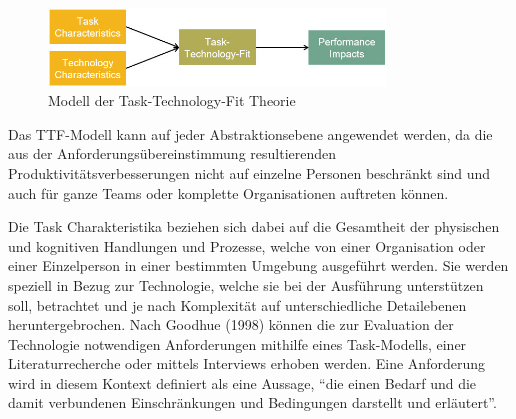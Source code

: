 \begin{figure}[h]
    \centering
    \includegraphics[width=0.8\textwidth]{img/TTF_einfach.jpg}
    \caption[Modell der Task-Technology-Fit Theorie]{Modell der Task-Technology-Fit Theorie\autocite{TTF}}
    \label{fig:TTF}
\end{figure}


Das TTF-Modell kann auf jeder Abstraktionsebene angewendet werden, da die aus der Anforderungsübereinstimmung resultierenden Produktivitätsverbesserungen nicht auf einzelne Personen beschränkt sind und auch für ganze Teams oder komplette Organisationen auftreten können.\autocite[Vgl.][S. 1827f]{GOODHUE1995b} 



Die Task Charakteristika beziehen sich dabei auf die Gesamtheit der physischen und kognitiven Handlungen und Prozesse, welche von einer Organisation oder einer Einzelperson in einer bestimmten Umgebung ausgeführt werden. Sie werden speziell in Bezug zur Technologie, welche sie bei der Ausführung unterstützen soll, betrachtet und je nach Komplexität auf unterschiedliche Detailebenen heruntergebrochen. \autocite[Vgl.][S. 398]{SPIES2020} Nach Goodhue (1998) können die zur Evaluation der Technologie notwendigen Anforderungen mithilfe eines Task-Modells, einer Literaturrecherche oder mittels Interviews erhoben werden.\autocite[Vgl.][S. 126]{GOODHUE1998} Eine Anforderung wird in diesem Kontext definiert als eine Aussage, \enquote{die einen Bedarf und die damit verbundenen Einschränkungen und Bedingungen darstellt und erläutert}.\autocite[Vgl.][]{ISO2017}

